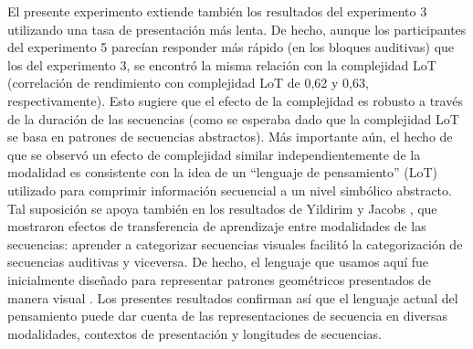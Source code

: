 
El presente experimento extiende también los resultados del experimento 3 utilizando una tasa de presentación más lenta. De hecho, aunque los participantes del experimento 5 parecían responder más rápido (en los bloques auditivas) que los del experimento 3, se encontró la misma relación con la complejidad LoT (correlación de rendimiento con complejidad LoT de 0,62 y 0,63, respectivamente). Esto sugiere que el efecto de la complejidad es robusto a través de la duración de las secuencias (como se esperaba dado que la complejidad LoT se basa en patrones de secuencias abstractos). Más importante aún, el hecho de que se observó un efecto de complejidad similar independientemente de la modalidad es consistente con la idea de un ``lenguaje de pensamiento'' (LoT) utilizado para comprimir información secuencial a un nivel simbólico abstracto. Tal suposición se apoya también en los resultados de Yildirim y Jacobs \cite{yildirim2015learning}, que mostraron efectos de transferencia de aprendizaje entre modalidades de las secuencias: aprender a categorizar secuencias visuales facilitó la categorización de secuencias auditivas y viceversa. De hecho, el lenguaje que usamos aquí fue inicialmente diseñado para representar patrones geométricos presentados de manera visual \cite{amalric2017language}. Los presentes resultados confirman así que el lenguaje actual del pensamiento puede dar cuenta de las representaciones de secuencia en diversas modalidades, contextos de presentación y longitudes de secuencias.

